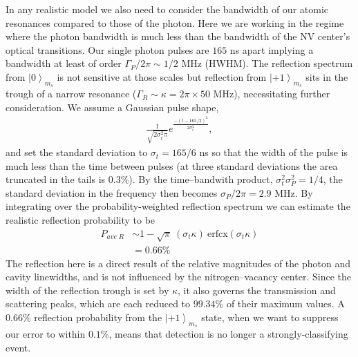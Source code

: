 \documentclass[aps,pra,amsmath,amssymb,reprint,superscriptaddress,tightenlines]{revtex4-1}
\begin{document}
In any realistic model we also need to consider the bandwidth of our atomic resonances compared to those of the photon. Here we are working in the regime where the photon bandwidth is much less than the bandwidth of the NV center's optical transitions.  Our single photon pulses are $165$ ns apart implying a bandwidth at least of order $\Gamma_{P}/ 2 \pi \sim 1/2$ MHz (HWHM). The reflection spectrum from $\left|0\right>_{m_{s}}$ is not sensitive at those scales but reflection from $\left|+1\right>_{m_{s}}$ sits in the trough of a narrow resonance ($\Gamma_{R} \sim \kappa = 2\pi \times 50$ MHz), necessitating further consideration. We assume a Gaussian pulse shape,
\begin{align}
	\frac{1}{\sqrt{2\sigma^{2}_{t}\pi}}e^{\frac{-(t-165/2)^{2}}{2\sigma^{2}_{t}}},
\end{align}
and set the standard deviation to $\sigma_{t}=165/6$ ns so that the width of the pulse is much less than the time between pulses (at three standard deviations the area truncated in the tails is $0.3$\%). By the time--bandwith product, $\sigma^{2}_{t} \sigma^{2}_{P}=1/4$, the standard deviation in the frequency then becomes $\sigma_{P}/2\pi = 2.9$ MHz. By integrating over the probability-weighted reflection spectrum we can estimate the realistic reflection probability to be
\begin{align}
	P_{ave\;R} &\sim 1 - \sqrt{\pi}\: (\sigma_{t}\kappa)\: \text{erfcx}\left(\sigma_{t}\kappa\right)\nonumber\\
	&= 0.66\%
\end{align}
The reflection here is a direct result of the relative magnitudes of the photon and cavity linewidths, and is not influenced by the nitrogen--vacancy center. Since the width of the reflection trough is set by $\kappa$, it also governs the transmission and scattering peaks, which are each reduced to $99.34$\% of their maximum values. A $0.66$\% reflection probability from the $\left|+1\right>_{m_{s}}$ state, when we want to suppress our error to within $0.1$\%, means that detection is no longer a strongly-classifying event.
\end{document}

